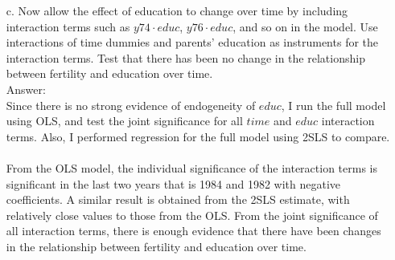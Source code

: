 \documentclass[10pt]{article}
\begin{document}
\begin{enumerate}
\item[c.] Now allow the effect of education to change over time by including interaction terms such as $y74\cdot educ$, $y76\cdot educ$, and so on in the model. Use interactions of time dummies and parents’ education as instruments for the interaction terms. Test that there has been no change in the relationship between fertility and education over time.
\\ Answer: \\
Since there is no strong evidence of endogeneity of $educ$, I run the full model using OLS, and test the joint significance for all $time$ and $educ$ interaction terms. Also, I performed regression for the full model using 2SLS to compare.\\ \\

From the OLS model, the individual significance of the interaction terms is significant in the last two years that is 1984 and 1982 with negative coefficients. A similar result is obtained from the 2SLS estimate, with relatively close values to those from the OLS. From the joint significance of all interaction terms, there is enough evidence that there have been changes in the relationship between fertility and education over time.
\end{enumerate}
\end{document}
